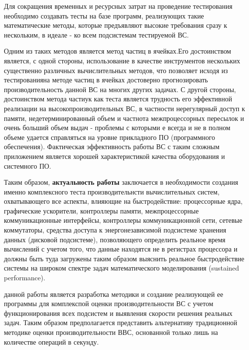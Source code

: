  Для сокращения временных и ресурсных затрат на проведение тестирования необходимо создавать тесты на базе программ, реализующих такие математические методы, которые предъявляют высокие требования сразу к нескольким, в идеале - ко всем подсистемам тестируемой ВС. 
 
 Одним из таких методов является метод частиц в ячейках.Его достоинством является, с одной стороны, использование в качестве инструментов нескольких существенно различных вычислительных методов, что позволяет исходя из тестированияна методе частиц в ячейках достоверно прогнозировать производительность данной ВС на многих других задачах. С другой стороны, достоинством метода частиук как теста является трудность его эффективной реализации на высокопроизводительных ВС, в частности нерегулярный доступ к памяти, недетерминированный объем и частнота межпроцессорных пересылок и очень больший объем выдач - проблемы с которыми е всегда и не в полном объеме удается справляться на уровне прикладного ПО (программного обеспечения). Фактическая эффективность работы ВС с таким сложным приложением является хорошей характеристикой качества оборудования и системного ПО.
 
 Таким образом,\textbf{ актуальность работы} заключается в необходимости создания именно комплексного теста производительнсти вычислительных систем, охватывающего все аспекты, влияющие на быстродействие: процессорные ядра, графические ускорители, контроллеры памяти, межпроцессорные коммуникационные интерфейсы, контроллеры коммуникационной сети, сетевые коммутаторы, средства доступа к энергонезависимой  подсистеме хранения данных (дисковой подсистеме), позволяющего определить  реальное время вычислений с учетом того, что данные находятся не в регистрах процессора и должны быть туда загружены таким образом выяснить реальное быстродействие системы на широком спектре задач математического моделирования (sustained performance). 


{\aim} данной работы является разработка методики и создание реализующей ее программы для комплекспой оценки производительности ВС с учетом функционирования всех подсистем  и выявления скорости решения реальных задач. Таким образом предполагается представить альтернативу традиционной методике оценки производительности ВВС, основанной только лишь на количестве операций в секунду.  


